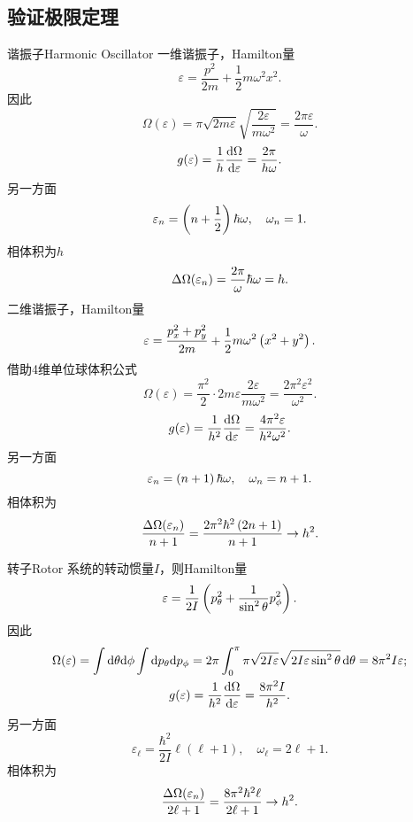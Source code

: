 \subsection*{验证极限定理}
\begin{example}{谐振子}{Harmonic Oscillator}
	一维谐振子，Hamilton量
	\[
		\varepsilon=\frac{p^2}{2m}+\frac12m\omega^2x^2.
	\]
	因此
	\[
		\Omega(\varepsilon)=\pi\sqrt{2m\varepsilon}\sqrt{\frac{2\varepsilon}{m\omega^2}}=\frac{2\pi\varepsilon}\omega.
	\]
	\[
		g(\varepsilon)=\frac1h\frac{\mathrm{d}^{\;\!\!}\Omega}{\mathrm{d} \varepsilon^{\;\!\!}}=\frac{2\pi}{h\omega}.
	\]
	另一方面
	\[
		\varepsilon_n=\left(n+\frac12\right)\hbar\omega,\quad\omega_n=1.
	\]
	相体积为$h$
	\[
		\Delta\Omega(\varepsilon_n)=\frac{2\pi}\omega\hbar\omega=h.
	\]
	\tcblower
	二维谐振子，Hamilton量
	\[
		\varepsilon=\frac{p_x^2+p_y^2}{2m}+\frac12m\omega^2\left(x^2+y^2\right).
	\]
	借助4维单位球体积公式
	\[
		\Omega(\varepsilon)=\frac{\pi^2}2\cdot2m\varepsilon\frac{2\varepsilon}{m\omega^2}=\frac{2\pi^2\varepsilon^2}{\omega^2}.
	\]
	\[
		g(\varepsilon)=\frac1{h^2 }\frac{\mathrm{d}^{\;\!\!}\Omega}{\mathrm{d} \varepsilon^{\;\!\!}}=\frac{4\pi^2\varepsilon}{h^2\omega^2}.
	\]
	另一方面
	\[
		\varepsilon_n=\left(n+1\right)\hbar\omega,\quad\omega_n=n+1.
	\]
	相体积为
	\[
		\frac{\Delta\Omega(\varepsilon_n)}{n+1}=\frac{2\pi^2\hbar^2\left(2n+1\right)}{n+1}\to h^2.
	\]
\end{example}
\begin{example}{转子}{Rotor}
	系统的转动惯量$I$，则Hamilton量
	\[
		\varepsilon=\frac1{2I}\left(p_\theta^2+\frac1{\sin^2\theta}p_\phi^2\right).
	\]
	因此
	\begin{gather}\notag
		\Omega(\varepsilon)=\int\mathop{}\!\mathrm{d}\theta\mathrm{d}\phi\int\mathop{}\!\mathrm{d} p_\theta\mathrm{d} p_\phi=2\pi\int_0^\pi\pi\sqrt{2I\varepsilon}\sqrt{2I\varepsilon\sin^2\theta}\mathop{}\!\mathrm{d}\theta=8\pi^2I\varepsilon;\\
		g(\varepsilon)=\frac1{h^2}\frac{\mathrm{d}^{\;\!\!}\Omega}{\mathrm{d} \varepsilon^{\;\!\!}}=\frac{8\pi^2I}{h^2}.
	\end{gather}
	另一方面
	\[
		\varepsilon_\ell=\frac{\hbar^2}{2I}\ell(\ell+1),\quad\omega_\ell=2\ell+1.
	\]
	相体积为
	\[
		\frac{\Delta\Omega(\varepsilon_n)}{2\ell+1}=\frac{8\pi^2\hbar^2\ell}{2\ell+1}\to h^2.
	\]
\end{example}
